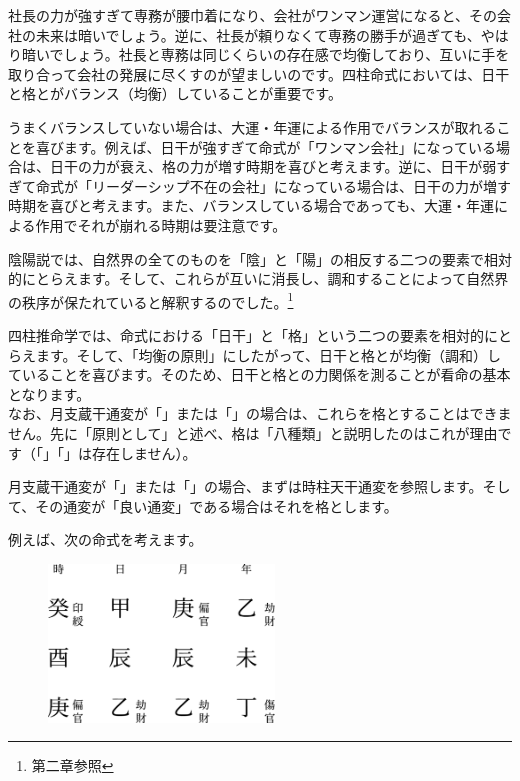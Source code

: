 \documentclass[a5paper,11pt,dvipdfmx]{tarticle}
\begin{document}
社長の力が強すぎて専務が腰巾着になり、会社がワンマン運営になると、その会社の未来は暗いでしょう。逆に、社長が頼りなくて専務の勝手が過ぎても、やはり暗いでしょう。社長と専務は同じくらいの存在感で均衡しており、互いに手を取り合って会社の発展に尽くすのが望ましいのです。四柱命式においては、日干と格とがバランス（均衡）していることが重要です。

うまくバランスしていない場合は、大運・年運による作用でバランスが取れることを喜びます。例えば、日干が強すぎて命式が「ワンマン会社」になっている場合は、日干の力が衰え、格の力が増す時期を喜びと考えます。逆に、日干が弱すぎて命式が「リーダーシップ不在の会社」になっている場合は、日干の力が増す時期を喜びと考えます。また、バランスしている場合であっても、大運・年運による作用でそれが崩れる時期は要注意です。

陰陽説では、自然界の全てのものを「陰」と「陽」の相反する二つの要素で相対的にとらえます。そして、これらが互いに消長し、調和することによって自然界の秩序が保たれていると解釈するのでした。\footnote{第二章参照}

四柱推命学では、命式における「日干」と「格」という二つの要素を相対的にとらえます。そして、「均衡の原則」にしたがって、日干と格とが均衡（調和）していることを喜びます。そのため、日干と格との力関係を測ることが看命の基本となります。\\

なお、月支蔵干通変が「」または「」の場合は、これらを格とすることはできません。先に「原則として」と述べ、格は「八種類」と説明したのはこれが理由です（「」「」は存在しません）。

月支蔵干通変が「」または「」の場合、まずは時柱天干通変を参照します。そして、その通変が「良い通変」である場合はそれを格とします。

例えば、次の命式を考えます。

\begin{figure}[h]
  \includegraphics[width=60mm,angle=90]{figs/figure5-8.eps}
\end{figure}
\end{document}
